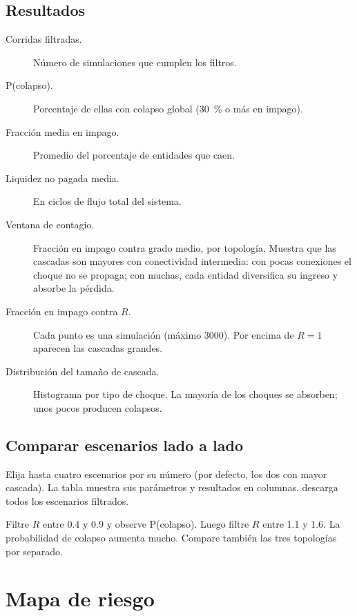\subsection*{Resultados}
\begin{description}
\item[Corridas filtradas.] Número de simulaciones que cumplen los filtros.
\item[P(colapso).] Porcentaje de ellas con colapso global (30~\% o más en impago).
\item[Fracción media en impago.] Promedio del porcentaje de entidades que caen.
\item[Liquidez no pagada media.] En ciclos de flujo total del sistema.
\item[Ventana de contagio.] Fracción en impago contra grado medio, por topología. Muestra
que las cascadas son mayores con conectividad intermedia: con pocas conexiones el choque
no se propaga; con muchas, cada entidad diversifica su ingreso y absorbe la pérdida.
\item[Fracción en impago contra $R$.] Cada punto es una simulación (máximo 3000). Por
encima de $R=1$ aparecen las cascadas grandes.
\item[Distribución del tamaño de cascada.] Histograma por tipo de choque. La mayoría de
los choques se absorben; unos pocos producen colapsos.
\end{description}


\subsection*{Comparar escenarios lado a lado}
Elija hasta cuatro escenarios por su número (por defecto, los dos con mayor cascada). La
tabla muestra sus parámetros y resultados en columnas. 
descarga todos los escenarios filtrados.

\begin{pruebe}
Filtre $R$ entre 0.4 y 0.9 y observe P(colapso). Luego filtre $R$ entre 1.1 y 1.6. La
probabilidad de colapso aumenta mucho. Compare también las tres topologías por separado.
\end{pruebe}

\section{Mapa de riesgo}

